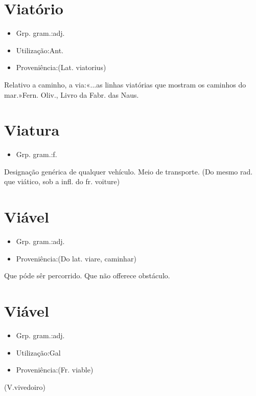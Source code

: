 \documentclass{article}
\begin{document}
\section{Viatório}
\begin{itemize}
\item {Grp. gram.:adj.}
\end{itemize}
\begin{itemize}
\item {Utilização:Ant.}
\end{itemize}
\begin{itemize}
\item {Proveniência:(Lat. \textunderscore viatorius\textunderscore )}
\end{itemize}
Relativo a caminho, a via:«\textunderscore ...as linhas viatórias que mostram os caminhos do mar.\textunderscore »Fern. Oliv., \textunderscore Livro da Fabr. das Naus\textunderscore .
\section{Viatura}
\begin{itemize}
\item {Grp. gram.:f.}
\end{itemize}
Designação genérica de qualquer vehículo.
Meio de transporte.
(Do mesmo rad. que \textunderscore viático\textunderscore , sob a infl. do fr. \textunderscore voiture\textunderscore )
\section{Viável}
\begin{itemize}
\item {Grp. gram.:adj.}
\end{itemize}
\begin{itemize}
\item {Proveniência:(Do lat. \textunderscore viare\textunderscore , caminhar)}
\end{itemize}
Que póde sêr percorrido.
Que não offerece obstáculo.
\section{Viável}
\begin{itemize}
\item {Grp. gram.:adj.}
\end{itemize}
\begin{itemize}
\item {Utilização:Gal}
\end{itemize}
\begin{itemize}
\item {Proveniência:(Fr. \textunderscore viable\textunderscore )}
\end{itemize}
(V.vivedoiro)
\end{document}
